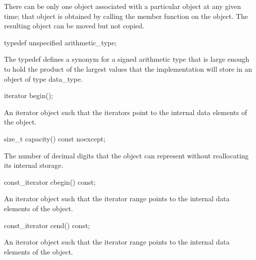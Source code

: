 \begin{addedblock}
There can be only one  object associated with a particular  object at any given time; that object is obtained by calling the  member function on the  object. The resulting object can be moved but not copied.

\begin{itemdecl}
typedef unspecified arithmetic_type;
\end{itemdecl}

\begin{itemdescr}
The typedef defines a synonym for a signed arithmetic type that is large enough to hold the product of the largest values that the implementation will store in an object of type data_type.
\end{itemdescr}

\begin{itemdecl}
iterator begin();
\end{itemdecl}

\begin{itemdescr}
\returns An iterator object such that the iterators \tcode{[begin(), end())} point to the internal data elements of the  object.
\end{itemdescr}

\begin{itemdecl}
size_t capacity() const noexcept;
\end{itemdecl}

\begin{itemdescr}
\returns The number of decimal digits that the  object can represent without reallocating its internal storage.
\end{itemdescr}

\begin{itemdecl}
const_iterator cbegin() const;
\end{itemdecl}

\begin{itemdescr}
\returns An iterator object such that the iterator range \tcode{[cbegin(), cend())} points to the internal data elements of the  object.
\end{itemdescr}

\begin{itemdecl}
const_iterator cend() const;
\end{itemdecl}

\begin{itemdescr}
\returns An iterator object such that the iterator range \tcode{[cbegin(), cend())} points to the internal data elements of the  object.
\end{itemdescr}


\end{addedblock}
